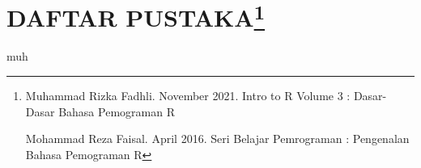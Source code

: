 \documentclass[
]{article}
\begin{document}
\section[DAFTAR PUSTAKA]{\texorpdfstring{DAFTAR
PUSTAKA\footnote{Muhammad Rizka Fadhli. November 2021. Intro to R Volume
  3 : Dasar-Dasar Bahasa Pemograman R

  Mohammad Reza Faisal. April 2016. Seri Belajar Pemrograman :
  Pengenalan Bahasa Pemograman R}}{DAFTAR PUSTAKA}}\label{daftar-pustaka1}

muh
\end{document}
